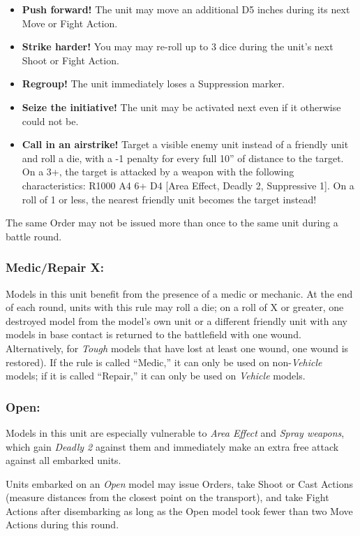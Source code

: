 \begin{multicols}{2}
\begin{itemize}
    \item \textbf{Push forward!} The unit may move an additional D5 inches during its next Move or Fight Action.
    \item \textbf{Strike harder!} You may may re-roll up to 3 dice during the unit's next Shoot or Fight Action.
    \item \textbf{Regroup!} The unit immediately loses a Suppression marker.
    \item \textbf{Seize the initiative!} The unit may be activated next even if it otherwise could not be.
    \item \textbf{Call in an airstrike!} Target a visible enemy unit instead of a friendly unit and roll a die, with a -1 penalty for every full 10'' of distance to the target. On a 3+, the target is attacked by a weapon with the following characteristics: R1000 A4 6+ D4 [Area Effect, Deadly 2, Suppressive 1]. On a roll of 1 or less, the nearest friendly unit becomes the target instead!
\end{itemize}

The same Order may not be issued more than once to the same unit during a battle round.

\subsubsection*{Medic/Repair X:} Models in this unit benefit from the presence of a medic or mechanic. At the end of each round, units with this rule may roll a die; on a roll of X or greater, one destroyed model from the model's own unit or a different friendly unit with any models in base contact is returned to the battlefield with one wound. Alternatively, for \textit{Tough} models that have lost at least one wound, one wound is restored). If the rule is called ``Medic,'' it can only be used on non-\textit{Vehicle} models; if it is called ``Repair,'' it can only be used on \textit{Vehicle} models.

\subsubsection*{Open:} Models in this unit are especially vulnerable to \textit{Area Effect} and \textit{Spray weapons}, which gain \textit{Deadly 2} against them and immediately make an extra free attack against all embarked units.

Units embarked on an \textit{Open} model may issue Orders, take Shoot or Cast Actions (measure distances from the closest point on the transport), and take Fight Actions after disembarking as long as the Open model took fewer than two Move Actions during this round.


\end{multicols}

